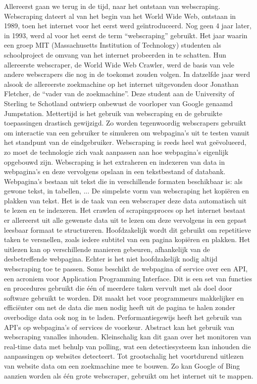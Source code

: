 Allereerst gaan we terug in de tijd, naar het ontstaan van webscraping. Webscraping dateert al van het begin van het World Wide Web, ontstaan in 1989, toen het internet voor het eerst werd geïntroduceerd. Nog geen 4 jaar later, in 1993, werd al voor het eerst de term “webscraping” gebruikt. Het jaar waarin een groep MIT (Massachusetts Institution of Technology) studenten als schoolproject de omvang van het internet probeerden in te schatten. Hun allereerste webscraper, de World Wide Web Crawler, werd de basis van vele andere webscrapers die nog in de toekomst zouden volgen. In datzelfde jaar werd alsook de allereerste zoekmachine op het internet uitgevonden door Jonathan Fletcher, de “vader van de zoekmachine”. Deze student aan de University of Sterling te Schotland ontwierp onbewust de voorloper van Google genaamd Jumpstation. \autocite{farholt2021less} Mettertijd is het gebruik van webscraping en de gebruikte toepassingen drastisch gewijzigd. Zo worden tegenwoordig webscrapers gebruikt om interactie van een gebruiker te simuleren om webpagina’s uit te testen vanuit het standpunt van de eindgebruiker.
Webscraping is reeds heel wat geëvolueerd, zo moet de technologie zich vaak aanpassen aan hoe webpagina’s eigenlijk opgebouwd zijn.
Webscraping is het extraheren en indexeren van data in webpagina’s en deze vervolgens opslaan in een tekstbestand of databank. Webpagina’s bestaan uit tekst die in verschillende formaten beschikbaar is: als gewone tekst, in tabellen, ... De simpelste vorm van webscraping het kopiëren en plakken van tekst. Het is de taak van een webscraper deze data automatisch uit te lezen en te indexeren. Het crawlen of scrapingsproces op het internet bestaat er allereerst uit alle gewenste data uit te lezen om deze vervolgens in een gepast leesbaar formaat te structureren.\autocite{zhao2017web} Hoofdzakelijk wordt dit gebruikt om repetitieve taken te versnellen, zoals iedere subtitel van een pagina kopiëren en plakken. Het uitlezen kan op verschillende manieren gebeuren, afhankelijk van de desbetreffende webpagina. Echter is het niet hoofdzakelijk nodig altijd webscraping toe te passen. Soms beschikt de webpagina of service over een API, een acroniem voor Application Programming Interface. Dit is een set van functies en procedures gebruikt die één of meerdere taken vervult met als doel door software gebruikt te worden. Dit maakt het voor programmeurs makkelijker en efficiënter om net de data die men nodig heeft uit de pagina te halen zonder overbodige data ook nog in te laden. Performantiegewijs heeft het gebruik van API’s op webpagina’s of services de voorkeur. \autocite{10.2307/251584}
Abstract kan het gebruik van webscraping vanalles inhouden. Kleinschalig kan dit gaan over het monitoren van real-time data met behulp van polling, wat een detectiesysteem kan inhouden die aanpassingen op websites detecteert. Tot grootschalig het voortdurend uitlezen van website data om een zoekmachine mee te bouwen. Zo kan Google of Bing aanzien worden als één grote webscraper, gebruikt om het internet uit te mappen. \autocite{snyder2003web}

